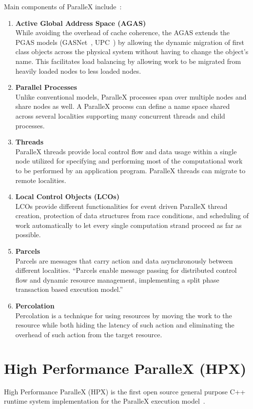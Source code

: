 Main components of ParalleX include~\cite{gao2007parallex,kaiser2009parallex,dekate2012improving}:
\begin{enumerate}
\item \textbf{Active Global Address Space (AGAS)}\\
  While avoiding the overhead of cache coherence, the AGAS extends the PGAS \cite{stitt2009introduction} models (GASNet~\cite{bonachea2002gasnet}, UPC~\cite{upc2005upc}) by allowing the dynamic migration of first class objects across the physical system without having to change the object's name. This facilitates load balancing by allowing work to be migrated from heavily loaded nodes to less loaded nodes.  
\item \textbf{Parallel Processes}\\
  Unlike conventional models, ParalleX processes span over multiple nodes and share nodes as well. A ParalleX process can define a name space shared across several localities supporting many concurrent threads and child processes.
\item \textbf{Threads}\\
  ParalleX threads provide local control flow and data usage within a single node utilized for specifying and performing most of the computational work to be performed by an application program. ParalleX threads can migrate to remote localities. 
\item \textbf{Local Control Objects (LCOs)}\\
  LCOs provide different functionalities for event driven ParalleX thread creation, protection of data structures from race conditions, and scheduling of work automatically to let every single computation strand proceed as far as possible.
\item \textbf{Parcels}\\
  Parcels are messages that carry action and data asynchronously between different localities. ``Parcels enable message passing for distributed control flow and dynamic resource management, implementing a split phase transaction based execution model.''~\cite{kaiser2009parallex}
\item \textbf{Percolation}\\
  Percolation is a technique for using resources by moving the work to the resource while both hiding the latency of such action and eliminating the overhead of such action from the target resource. 
\end{enumerate}


\section{High Performance ParalleX (HPX)}
\label{sec:hpx}
High Performance ParalleX (HPX) is the first open source general purpose C++ runtime system implementation for the ParalleX execution model~\cite{huck2013early,kaiser2014hpx}.


